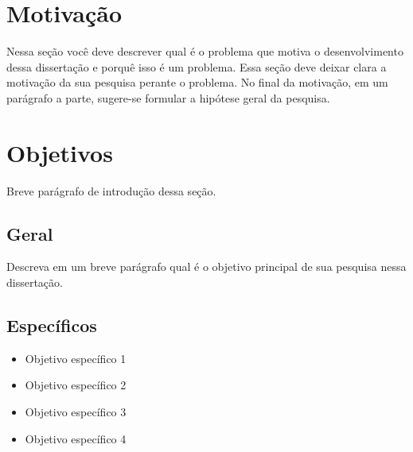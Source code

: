 \documentclass[final]{rc-book-2.14}
\begin{document}
 
\section{Motivação}
\label{sec:introduction:motivation}

Nessa seção você deve descrever qual é o problema que motiva o desenvolvimento dessa dissertação e porquê isso é um problema. Essa seção deve deixar clara a motivação da sua pesquisa perante o problema. No final da motivação, em um parágrafo a parte, sugere-se formular a hipótese geral da pesquisa. 
 

\section{Objetivos}
\label{sec:introduction:goal}

Breve parágrafo de introdução dessa seção.


\subsection{Geral}
\label{subsec:introduction:goal:general}

\begin{citeverbatim}
Descreva em um breve parágrafo qual é o objetivo principal de sua pesquisa nessa dissertação.
\end{citeverbatim}


\subsection{Específicos}
\label{subsec:introduction:goal:specific}

\begin{itemize}
  \item Objetivo específico 1
  \item Objetivo específico 2
  \item Objetivo específico 3
  \item Objetivo específico 4
\end{itemize}
\end{document}
